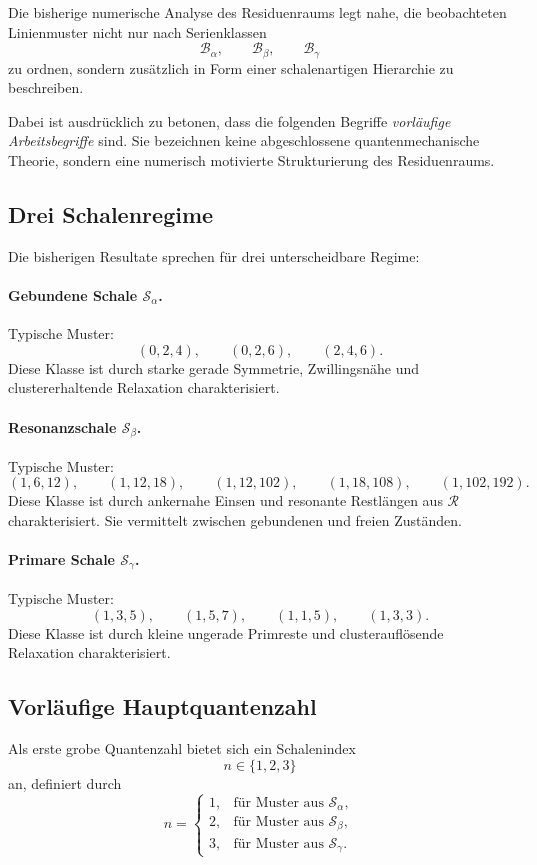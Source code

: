 \documentclass[11pt,a4paper]{article}
\theoremstyle{definition}
\theoremstyle{plain}
\theoremstyle{remark}
\begin{document}
	Die bisherige numerische Analyse des Residuenraums legt nahe, die beobachteten Linienmuster nicht nur nach Serienklassen
	\[
	\mathcal B_\alpha,\qquad \mathcal B_\beta,\qquad \mathcal B_\gamma
	\]
	zu ordnen, sondern zusätzlich in Form einer schalenartigen Hierarchie zu beschreiben.
	
	Dabei ist ausdrücklich zu betonen, dass die folgenden Begriffe \emph{vorläufige Arbeitsbegriffe} sind. 
	Sie bezeichnen keine abgeschlossene quantenmechanische Theorie, sondern eine numerisch motivierte Strukturierung des Residuenraums.
	
	\subsection{Drei Schalenregime}
	
	Die bisherigen Resultate sprechen für drei unterscheidbare Regime:
	
	\paragraph{Gebundene Schale \(\mathcal S_\alpha\).}
	Typische Muster:
	\[
	(0,2,4),\qquad (0,2,6),\qquad (2,4,6).
	\]
	Diese Klasse ist durch starke gerade Symmetrie, Zwillingsnähe und clustererhaltende Relaxation charakterisiert.
	
	\paragraph{Resonanzschale \(\mathcal S_\beta\).}
	Typische Muster:
	\[
	(1,6,12),\qquad (1,12,18),\qquad (1,12,102),\qquad (1,18,108),\qquad (1,102,192).
	\]
	Diese Klasse ist durch ankernahe Einsen und resonante Restlängen aus \(\mathcal R\) charakterisiert. 
	Sie vermittelt zwischen gebundenen und freien Zuständen.
	
	\paragraph{Primare Schale \(\mathcal S_\gamma\).}
	Typische Muster:
	\[
	(1,3,5),\qquad (1,5,7),\qquad (1,1,5),\qquad (1,3,3).
	\]
	Diese Klasse ist durch kleine ungerade Primreste und clusterauflösende Relaxation charakterisiert.
	
	\subsection{Vorläufige Hauptquantenzahl}
	
	Als erste grobe Quantenzahl bietet sich ein Schalenindex
	\[
	n\in\{1,2,3\}
	\]
	an, definiert durch
	\[
	n=
	\begin{cases}
		1,& \text{für Muster aus } \mathcal S_\alpha,\\[1ex]
		2,& \text{für Muster aus } \mathcal S_\beta,\\[1ex]
		3,& \text{für Muster aus } \mathcal S_\gamma.
	\end{cases}
	\]
	
\end{document}
